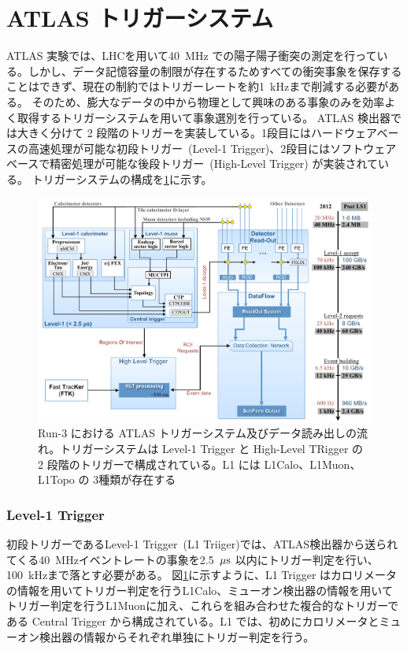 \section{ATLAS トリガーシステム}
ATLAS 実験では、LHCを用いて40~MHz での陽子陽子衝突の測定を行っている。しかし、データ記憶容量の制限が存在するためすべての衝突事象を保存することはできず、現在の制約ではトリガーレートを約1~kHzまで削減する必要がある。
そのため、膨大なデータの中から物理として興味のある事象のみを効率よく取得するトリガーシステムを用いて事象選別を行っている。
ATLAS 検出器では大きく分けて 2 段階のトリガーを実装している。1段目にはハードウェアベースの高速処理が可能な初段トリガー~(Level-1 Trigger)、2段目にはソフトウェアベースで精密処理が可能な後段トリガー~(High-Level Trigger) が実装されている。
トリガーシステムの構成を\ref{fig:トリガーの全体像}に示す。

\begin{figure}[tb]
  \centering
  \includegraphics[clip, width=14cm]{fig/3/trigger-nagare2.pdf}
  \caption{Run-3 における ATLAS トリガーシステム及びデータ読み出しの流れ\cite{article:Run3trigger}。トリガーシステムは Level-1 Trigger と High-Level TRigger の 2 段階のトリガーで構成されている。L1 には L1Calo、L1Muon、L1Topo の 3種類が存在する}
  \label{fig:トリガーの全体像}
\end{figure}

\subsubsection{Level-1 Trigger}
初段トリガーであるLevel-1 Trigger~(L1 Triiger)では、ATLAS検出器から送られてくる40~MHzイベントレートの事象を2.5~$\rm{\mu s}$ 以内にトリガー判定を行い、100~kHzまで落とす必要がある。
図\ref{fig:トリガーの全体像}に示すように、L1 Trigger はカロリメータの情報を用いてトリガー判定を行うL1Calo、ミューオン検出器の情報を用いてトリガー判定を行うL1Muonに加え、これらを組み合わせた複合的なトリガーである Central Trigger から構成されている。L1 では、初めにカロリメータとミューオン検出器の情報からそれぞれ単独にトリガー判定を行う。

